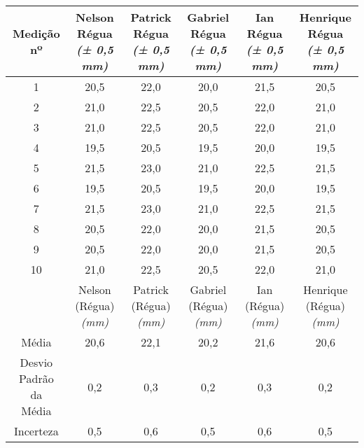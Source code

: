 \documentclass{article}
\begin{document}
\begin{table}[h!]
\centering
\begin{tabular}{c c c c c c }
\toprule
Medição nº & \shortstack{Nelson\\Régua\\\textit{(± 0,5 mm)}} & \shortstack{Patrick\\Régua\\\textit{(± 0,5 mm)}} & \shortstack{Gabriel\\Régua\\\textit{(± 0,5 mm)}} & \shortstack{Ian\\Régua\\\textit{(± 0,5 mm)}} & \shortstack{Henrique\\Régua\\\textit{(± 0,5 mm)}}\\
\midrule
1 & 20,5 & 22,0 & 20,0 & 21,5 & 20,5\\
2 & 21,0 & 22,5 & 20,5 & 22,0 & 21,0\\
3 & 21,0 & 22,5 & 20,5 & 22,0 & 21,0\\
4 & 19,5 & 20,5 & 19,5 & 20,0 & 19,5\\
5 & 21,5 & 23,0 & 21,0 & 22,5 & 21,5\\
6 & 19,5 & 20,5 & 19,5 & 20,0 & 19,5\\
7 & 21,5 & 23,0 & 21,0 & 22,5 & 21,5\\
8 & 20,5 & 22,0 & 20,0 & 21,5 & 20,5\\
9 & 20,5 & 22,0 & 20,0 & 21,5 & 20,5\\
10 & 21,0 & 22,5 & 20,5 & 22,0 & 21,0\\
\midrule
&\shortstack{Nelson\\(Régua)\\\textit{(mm)}} & \shortstack{Patrick\\(Régua)\\\textit{(mm)}} & \shortstack{Gabriel\\(Régua)\\\textit{(mm)}} & \shortstack{Ian\\(Régua)\\\textit{(mm)}} & \shortstack{Henrique\\(Régua)\\\textit{(mm)}}\\
\midrule
Média & 20,6 & 22,1 & 20,2 & 21,6 & 20,6\\[3pt]
\shortstack{Desvio\\Padrão da\\Média} & 0,2 & 0,3 & 0,2 & 0,3 & 0,2\\[3pt]
Incerteza & 0,5 & 0,6 & 0,5 & 0,6 & 0,5\\
\bottomrule
\end{tabular}
\end{table}
\end{document}
